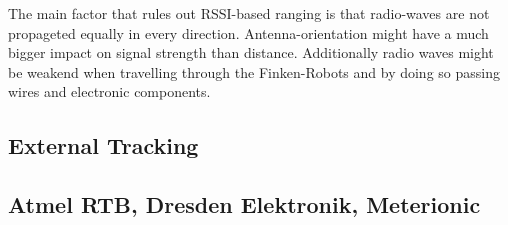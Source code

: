 The main factor that rules out RSSI-based ranging is that radio-waves are not propageted equally in every direction. 
Antenna-orientation might have a much bigger impact on signal strength than distance.
Additionally radio waves might be weakend when travelling through the Finken-Robots and by doing so passing wires and electronic components.

\subsection{External Tracking}




\subsection{Atmel RTB, Dresden Elektronik, Meterionic}

